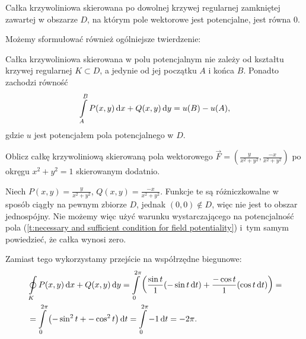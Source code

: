 \begin{corollary}
    Całka krzywoliniowa skierowana po dowolnej krzywej regularnej zamkniętej zawartej w obszarze $D$, na którym pole wektorowe jest potencjalne, jest równa $0$.
\end{corollary}

Możemy sformułować również ogólniejsze twierdzenie:
\begin{theorem}
    \label{t:independence of path in a conservative vector field}
    Całka krzywoliniowa skierowana w polu potencjalnym nie zależy od kształtu krzywej regularnej $K \subset D$, a jedynie od jej początku $A$ i końca $B$. Ponadto zachodzi równość
    \[ \int\limits_{A}^B P(x, y) \operatorname{d}\!{x} + Q(x, y) \operatorname{d}\!{y} = u(B) - u(A), \]
    gdzie $u$ jest potencjałem pola potencjalnego w $D$.
\end{theorem}

\begin{example}
    Oblicz całkę krzywoliniową skierowaną pola wektorowego $\vec{F} = \left(\frac{y}{x^2 + y^2}, \frac{-x}{x^2 + y^2}\right)$ po okręgu $x^2 + y^2 = 1$ skierowanym dodatnio.
\end{example}
\begin{solution}
    Niech $P(x, y) = \frac{y}{x^2 + y^2}$, $Q(x, y) = \frac{-x}{x^2 + y^2}$. Funkcje te są różniczkowalne w sposób ciągły na pewnym zbiorze $D$, jednak $(0, 0) \notin D$, więc nie jest to obszar jednospójny. Nie możemy więc użyć warunku wystarczającego na potencjalność pola (\ref{t:necessary and sufficient condition for field potentiality}) i~tym samym powiedzieć, że całka wynosi zero.

    Zamiast tego wykorzystamy przejście na współrzędne biegunowe:
    \begin{align*}
        &\oint\limits_K P(x, y) \operatorname{d}\!{x} + Q(x, y) \operatorname{d}\!{y} = \int\limits_0^{2\pi}\left( \frac{\sin t}{1} (-\sin t \operatorname{d}\!{t}) + \frac{-\cos t}{1} (\cos t \operatorname{d}\!{t})\right) = \\
        &= \int\limits_0^{2\pi}\left(-\sin^2 t + -\cos^2 t \right) \operatorname{d}\!{t} = \int\limits_0^{2\pi} -1 \operatorname{d}\!{t} = -2 \pi.
    \end{align*}
\end{solution}

